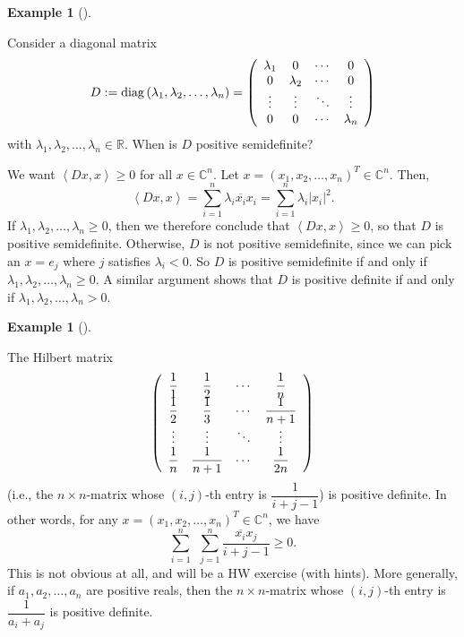 \documentclass[numbers=enddot,12pt,final,onecolumn,notitlepage]{scrartcl}%
\newcounter{exer}
\numberwithin{exer}{subsection}
\theoremstyle{definition}
\newtheorem{exam}[theo]{Example}
\newenvironment{example}[1][]
{\begin{exam}[#1]\begin{leftbar}}
{\end{leftbar}\end{exam}}
\let\sumnonlimits\sum
\renewcommand{\sum}{\sumnonlimits\limits}
\begin{document}
\begin{example}
Consider a diagonal matrix
\[
D:=\operatorname*{diag}\left(  \lambda_{1},\lambda_{2},\ldots,\lambda
_{n}\right)  =\left(
\begin{array}
[c]{cccc}%
\lambda_{1} & 0 & \cdots & 0\\
0 & \lambda_{2} & \cdots & 0\\
\vdots & \vdots & \ddots & \vdots\\
0 & 0 & \cdots & \lambda_{n}%
\end{array}
\right)
\]
with $\lambda_{1},\lambda_{2},\ldots,\lambda_{n}\in\mathbb{R}$. When is $D$
positive semidefinite?

We want $\left\langle Dx,x\right\rangle \geq0$ for all $x\in\mathbb{C}^{n}$.
Let $x=\left(  x_{1},x_{2},\ldots,x_{n}\right)  ^{T}\in\mathbb{C}^{n}$. Then,%
\[
\left\langle Dx,x\right\rangle =\sum_{i=1}^{n}\lambda_{i}\overline{x_{i}}%
x_{i}=\sum_{i=1}^{n}\lambda_{i}\left\vert x_{i}\right\vert ^{2}.
\]
If $\lambda_{1},\lambda_{2},\ldots,\lambda_{n}\geq0$, then we therefore
conclude that $\left\langle Dx,x\right\rangle \geq0$, so that $D$ is positive
semidefinite. Otherwise, $D$ is not positive semidefinite, since we can pick
an $x=e_{j}$ where $j$ satisfies $\lambda_{i}<0$. So $D$ is positive
semidefinite if and only if $\lambda_{1},\lambda_{2},\ldots,\lambda_{n}\geq0$.
A similar argument shows that $D$ is positive definite if and only if
$\lambda_{1},\lambda_{2},\ldots,\lambda_{n}>0$.
\end{example}

\begin{example}
The Hilbert matrix%
\[
\left(
\begin{array}
[c]{cccc}%
\dfrac{1}{1} & \dfrac{1}{2} & \cdots & \dfrac{1}{n}\\
\dfrac{1}{2} & \dfrac{1}{3} & \cdots & \dfrac{1}{n+1}\\
\vdots & \vdots & \ddots & \vdots\\
\dfrac{1}{n} & \dfrac{1}{n+1} & \cdots & \dfrac{1}{2n}%
\end{array}
\right)
\]
(i.e., the $n\times n$-matrix whose $\left(  i,j\right)  $-th entry is
$\dfrac{1}{i+j-1}$) is positive definite. In other words, for any $x=\left(
x_{1},x_{2},\ldots,x_{n}\right)  ^{T}\in\mathbb{C}^{n}$, we have%
\[
\sum_{i=1}^{n}\ \ \sum_{j=1}^{n}\dfrac{\overline{x_{i}}x_{j}}{i+j-1}\geq0.
\]
This is not obvious at all, and will be a HW exercise (with hints). More
generally, if $a_{1},a_{2},\ldots,a_{n}$ are positive reals, then the $n\times
n$-matrix whose $\left(  i,j\right)  $-th entry is $\dfrac{1}{a_{i}+a_{j}}$ is
positive definite.
\end{example}
\end{document}
